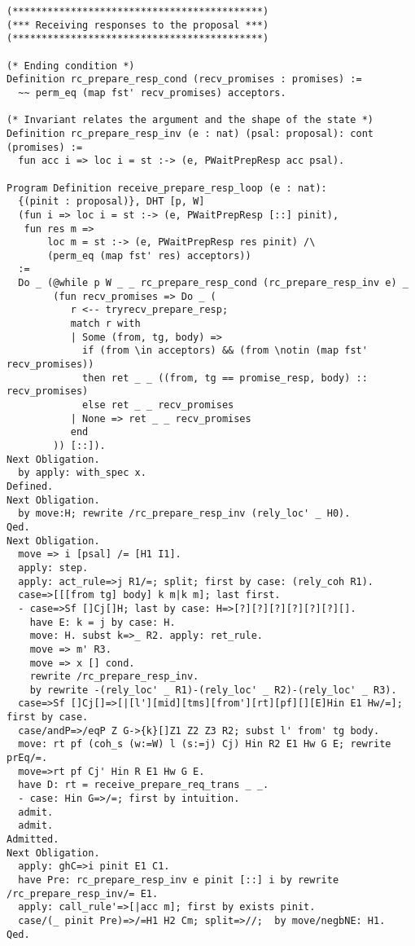 \begin{landscape}
\begin{multicols*}{2}
\begin{lstlisting}[style=SourceCodeListing]
(*******************************************)
(*** Receiving responses to the proposal ***)
(*******************************************)

(* Ending condition *)
Definition rc_prepare_resp_cond (recv_promises : promises) :=
  ~~ perm_eq (map fst' recv_promises) acceptors.

(* Invariant relates the argument and the shape of the state *)
Definition rc_prepare_resp_inv (e : nat) (psal: proposal): cont (promises) :=
  fun acc i => loc i = st :-> (e, PWaitPrepResp acc psal).

Program Definition receive_prepare_resp_loop (e : nat):
  {(pinit : proposal)}, DHT [p, W]
  (fun i => loc i = st :-> (e, PWaitPrepResp [::] pinit),
   fun res m =>
       loc m = st :-> (e, PWaitPrepResp res pinit) /\
       (perm_eq (map fst' res) acceptors))
  :=
  Do _ (@while p W _ _ rc_prepare_resp_cond (rc_prepare_resp_inv e) _
        (fun recv_promises => Do _ (
           r <-- tryrecv_prepare_resp;
           match r with
           | Some (from, tg, body) =>
             if (from \in acceptors) && (from \notin (map fst' recv_promises))
             then ret _ _ ((from, tg == promise_resp, body) :: recv_promises)
             else ret _ _ recv_promises
           | None => ret _ _ recv_promises
           end
        )) [::]).
Next Obligation.
  by apply: with_spec x.
Defined.
Next Obligation.
  by move:H; rewrite /rc_prepare_resp_inv (rely_loc' _ H0).
Qed.
Next Obligation.
  move => i [psal] /= [H1 I1].
  apply: step.
  apply: act_rule=>j R1/=; split; first by case: (rely_coh R1).
  case=>[[[from tg] body] k m|k m]; last first.
  - case=>Sf []Cj[]H; last by case: H=>[?][?][?][?][?][?][].
    have E: k = j by case: H.
    move: H. subst k=>_ R2. apply: ret_rule.
    move => m' R3.
    move => x [] cond.
    rewrite /rc_prepare_resp_inv.
    by rewrite -(rely_loc' _ R1)-(rely_loc' _ R2)-(rely_loc' _ R3).
  case=>Sf []Cj[]=>[|[l'][mid][tms][from'][rt][pf][][E]Hin E1 Hw/=]; first by case.
  case/andP=>/eqP Z G->{k}[]Z1 Z2 Z3 R2; subst l' from' tg body.
  move: rt pf (coh_s (w:=W) l (s:=j) Cj) Hin R2 E1 Hw G E; rewrite prEq/=.
  move=>rt pf Cj' Hin R E1 Hw G E.
  have D: rt = receive_prepare_req_trans _ _.
  - case: Hin G=>/=; first by intuition.
  admit.
  admit.
Admitted.
Next Obligation.
  apply: ghC=>i pinit E1 C1.
  have Pre: rc_prepare_resp_inv e pinit [::] i by rewrite /rc_prepare_resp_inv/= E1.
  apply: call_rule'=>[|acc m]; first by exists pinit.
  case/(_ pinit Pre)=>/=H1 H2 Cm; split=>//;  by move/negbNE: H1.
Qed.


\end{lstlisting}
\end{multicols*}
\end{landscape}
